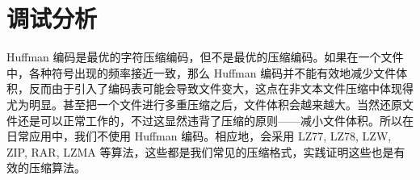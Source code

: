 \section{调试分析}


Huffman 编码是最优的字符压缩编码，但不是最优的压缩编码。如果在一个文件中，各种符号出现的频率接近一致，那么 Huffman 编码并不能有效地减少文件体积，反而由于引入了编码表可能会导致文件变大，这点在非文本文件压缩中体现得尤为明显。甚至把一个文件进行多重压缩之后，文件体积会越来越大。当然还原文件还是可以正常工作的，不过这显然违背了压缩的原则——减小文件体积。所以在日常应用中，我们不使用 Huffman 编码。相应地，会采用 LZ77\cite{lz77}, LZ78\cite{lz78}, LZW\cite{lzw}, ZIP\cite{zip}, RAR\cite{rar}, LZMA\cite{lzma} 等算法，这些都是我们常见的压缩格式，实践证明这些也是有效的压缩算法。
